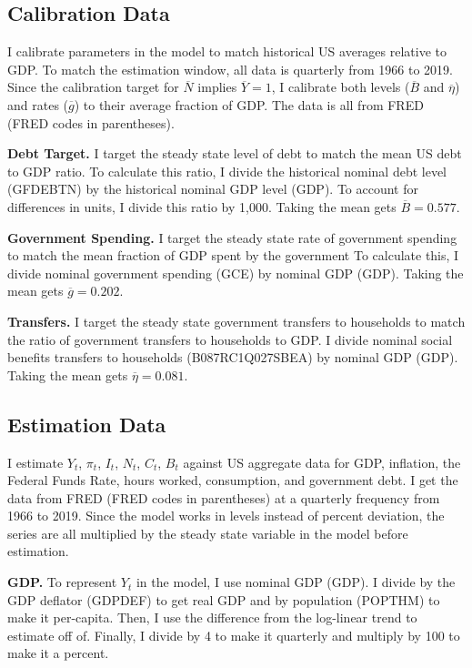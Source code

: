 \subsection{Calibration Data} \label{subapp:cal-data}
I calibrate parameters in the model to match historical US averages relative to GDP. To match the estimation window, all data is quarterly from 1966 to 2019. Since the calibration target for $\overline{N}$ implies $\overline{Y} = 1$, I calibrate both levels ($\overline{B}$ and $\overline{\eta}$) and rates ($\overline{g}$) to their average fraction of GDP. The data is all from FRED (FRED codes in parentheses).

\textbf{Debt Target.}
I target the steady state level of debt to match the mean US debt to GDP ratio. To calculate this ratio, I divide the historical nominal debt level (GFDEBTN) by the historical nominal GDP level (GDP). To account for differences in units, I divide this ratio by 1,000. Taking the mean gets $\overline{B} = 0.577$.

\textbf{Government Spending.}
I target the steady state rate of government spending to match the mean fraction of GDP spent by the government To calculate this, I divide nominal government spending (GCE) by nominal GDP (GDP). Taking the mean gets $\overline{g} = 0.202$.

\textbf{Transfers.} 
I target the steady state government transfers to households to match the ratio of government transfers to households to GDP. I divide nominal social benefits transfers to households (B087RC1Q027SBEA) by nominal GDP (GDP). Taking the mean gets $\overline{\eta} = 0.081$.


\subsection{Estimation Data} \label{subapp:esti-data}
I estimate $Y_t$, $\pi_t$, $I_t$, $N_t$, $C_t$, $B_t$ against US aggregate data for GDP, inflation, the Federal Funds Rate, hours worked, consumption, and government debt. I get the data from FRED (FRED codes in parentheses) at a quarterly frequency from 1966 to 2019. Since the model works in levels instead of percent deviation, the series are all multiplied by the steady state variable in the model before estimation.

\textbf{GDP.}
To represent $Y_t$ in the model, I use nominal GDP (GDP). I divide by the GDP deflator (GDPDEF) to get real GDP and by population (POPTHM) to make it per-capita. Then, I use the difference from the log-linear trend to estimate off of. Finally, I divide by 4 to make it quarterly and multiply by 100 to make it a percent.

